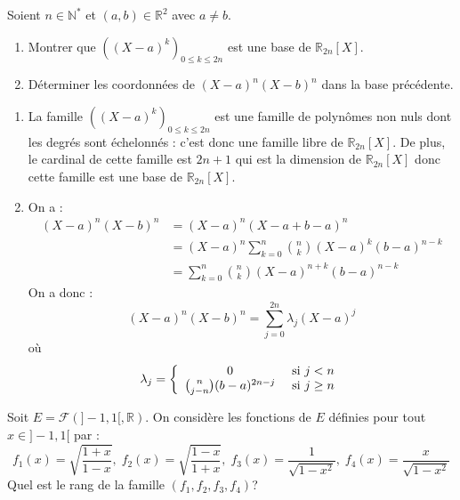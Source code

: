 \documentclass[a4paper,10pt]{report}
\begin{document}
\medskip


\begin{Exercice}{} Soient $n \in \mathbb{N}^*$ et $(a,b) \in \mathbb{R}^2$ avec $a \neq b$.
\begin{enumerate}
\item Montrer que $((X-a)^k)_{0 \leq k \leq 2n}$ est une base de $\mathbb{R}_{2n}[X]$.
\item Déterminer les coordonnées de $(X-a)^n(X-b)^n$ dans la base précédente.
\end{enumerate}
\end{Exercice} 

\corr 

\begin{enumerate}
\item La famille $((X-a)^k)_{0 \leq k \leq 2n}$ est une famille de polynômes non nuls dont les degrés sont échelonnés : c'est donc une famille libre de $\mathbb{R}_{2n}[X]$. De plus, le cardinal de cette famille est $2n+1$ qui est la dimension de $\mathbb{R}_{2n}[X]$ donc cette famille est une base de $\mathbb{R}_{2n}[X]$.
\item On a :
\begin{align*}
(X-a)^n(X-b)^n & = (X-a)^n (X-a + b-a)^n \\
& = (X-a)^n \sum_{k=0}^n \binom{n}{k} (X-a)^k (b-a)^{n-k} \\
& = \sum_{k=0}^n \binom{n}{k} (X-a)^{n+k} (b-a)^{n-k} 
\end{align*}
On a donc :
$$ (X-a)^n(X-b)^n = \sum_{j=0}^{2n} \lambda_j (X-a)^j$$
où 
$$ \lambda_j = \left\lbrace \begin{array}{ccl}
0 & \hbox{ si } j <n\\
\binom{n}{j-n} (b-a)^{2n-j} & \hbox{ si } j \geq n \\
\end{array}\right.$$
\end{enumerate}

\medskip

\begin{Exercice}{} Soit $E = \mathcal{F}(]-1,1[, \mathbb{R})$. On considère les fonctions de $E$ définies pour tout $x \in ]-1,1[$ par : 
    \[
    f_1(x) = \sqrt {\frac{1 + x}{1 - x}} , \; f_2(x) = \sqrt {\frac{1 - x}{1 + x}} , \; f_3(x) = \frac{1}{\sqrt {1 - x^2}}, \; f_4(x) = \frac{x}{\sqrt {1 - x^2}}
    \]
Quel est le rang de la famille $(f_1 ,f_2 ,f_3 ,f_4)$?
\end{Exercice}
\end{document}
